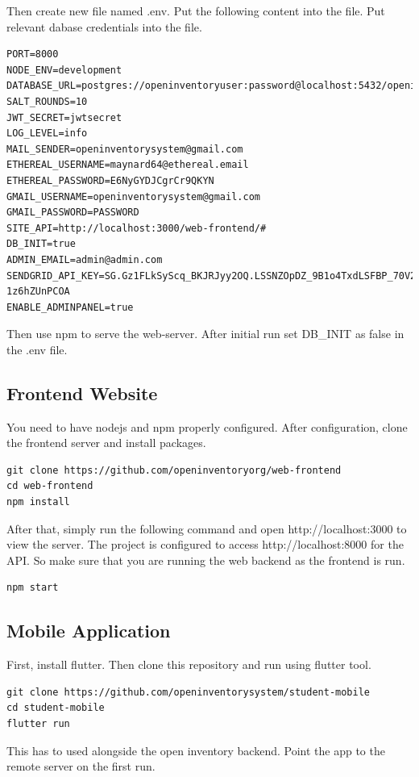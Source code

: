 \documentclass[12pt,a4paper]{article}
\begin{document}
Then create new file named .env. Put the following content into the file. Put relevant dabase credentials into the file.

\begin{lstlisting}
PORT=8000
NODE_ENV=development
DATABASE_URL=postgres://openinventoryuser:password@localhost:5432/openinventorydatabase
SALT_ROUNDS=10
JWT_SECRET=jwtsecret
LOG_LEVEL=info
MAIL_SENDER=openinventorysystem@gmail.com
ETHEREAL_USERNAME=maynard64@ethereal.email
ETHEREAL_PASSWORD=E6NyGYDJCgrCr9QKYN
GMAIL_USERNAME=openinventorysystem@gmail.com
GMAIL_PASSWORD=PASSWORD
SITE_API=http://localhost:3000/web-frontend/#
DB_INIT=true
ADMIN_EMAIL=admin@admin.com
SENDGRID_API_KEY=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
ENABLE_ADMINPANEL=true
\end{lstlisting}

Then use npm to serve the web-server. After initial run set DB\_INIT as false in the .env file.

\subsection{Frontend Website}

You need to have nodejs and npm properly configured. After configuration, clone the frontend server and install packages.

\begin{lstlisting}
git clone https://github.com/openinventoryorg/web-frontend
cd web-frontend
npm install
\end{lstlisting}

After that, simply run the following command and open http://localhost:3000 to view the server. The project is configured to access http://localhost:8000 for the API. So make sure that you are running the web backend as the frontend is run.

\begin{lstlisting}
npm start
\end{lstlisting}

\subsection{Mobile Application}

First, install flutter. Then clone this repository and run using flutter tool.

\begin{lstlisting}
git clone https://github.com/openinventorysystem/student-mobile
cd student-mobile
flutter run
\end{lstlisting}

This has to used alongside the open inventory backend. Point the app to the remote server on the first run.
\end{document}
